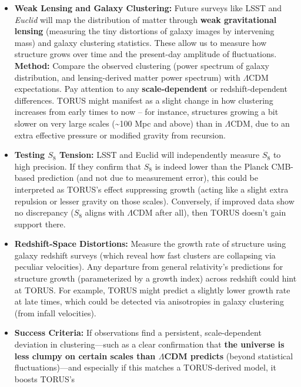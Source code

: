 \documentclass[]{article}
\newcommand{\subscript}[1]{\ensuremath{_{\mathrm{#1}}}}
\begin{document}
\begin{itemize}
  \begin{itemize}
  \item
    \textbf{Weak Lensing and Galaxy Clustering:} Future surveys like
    LSST and \emph{Euclid} will map the distribution of matter through
    \textbf{weak gravitational lensing} (measuring the tiny distortions
    of galaxy images by intervening mass) and galaxy clustering
    statistics. These allow us to measure how structure grows over time
    and the present-day amplitude of fluctuations. \textbf{Method:}
    Compare the observed clustering (power spectrum of galaxy
    distribution, and lensing-derived matter power spectrum) with $\Lambda$CDM
    expectations. Pay attention to any \textbf{scale-dependent} or
    redshift-dependent differences. TORUS might manifest as a slight
    change in how clustering increases from early times to now -- for
    instance, structures growing a bit slower on very large scales
    (\textasciitilde{}100 Mpc and above) than in $\Lambda$CDM, due to an extra
    effective pressure or modified gravity from recursion.
  \item
    \textbf{Testing
    $S\subscript{8}$
    Tension:} LSST and Euclid will independently measure
    $S\subscript{8}$ to high
    precision. If they confirm that
    $S\subscript{8}$ is
    indeed lower than the Planck CMB-based prediction (and not due to
    measurement error), this could be interpreted as TORUS's effect
    suppressing growth (acting like a slight extra repulsion or lesser
    gravity on those scales)​. Conversely, if improved data show no
    discrepancy
    ($S\subscript{8}$ aligns
    with $\Lambda$CDM after all), then TORUS doesn't gain support there.
  \item
    \textbf{Redshift-Space Distortions:} Measure the growth rate of
    structure using galaxy redshift surveys (which reveal how fast
    clusters are collapsing via peculiar velocities). Any departure from
    general relativity's predictions for structure growth (parameterized
    by a growth index) across redshift could hint at TORUS. For example,
    TORUS might predict a slightly lower growth rate at late times,
    which could be detected via anisotropies in galaxy clustering (from
    infall velocities).
  \item
    \textbf{Success Criteria:} If observations find a persistent,
    scale-dependent deviation in clustering---such as a clear
    confirmation that \textbf{the universe is less clumpy on certain
    scales than $\Lambda$CDM predicts} (beyond statistical fluctuations)---and
    especially if this matches a TORUS-derived model, it boosts TORUS's

\end{itemize}
\end{itemize}
\end{document}
